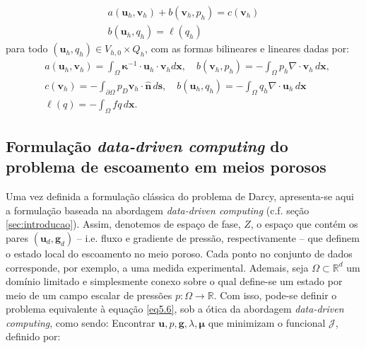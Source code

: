 \begin{equation}
	\begin{aligned}
		a(\mathbf{u}_h , \mathbf{v}_h) + b(\mathbf{v}_h , p_h) = c(\mathbf{v}_h)\\
		b(\mathbf{u}_h , q_h) = \ell(q_h)
	\end{aligned}
\end{equation}
para todo \((\mathbf{u}_h , q_h) \in V_{h,0} \times Q_h\),  com as formas bilineares e lineares dadas por:
\begin{equation}
	\begin{aligned}
		&a(\mathbf{u}_h, \mathbf{v}_{h}) = \int_{\Omega} \boldsymbol{\kappa}^{-1} \cdot \mathbf{u}_{h} \cdot \mathbf{v}_{h} d\mathbf{x}, \quad b(\mathbf{v}_{h},p_{h}) = -\int_{\Omega} p_{h} \nabla \cdot \mathbf{v}_{h} \, d\mathbf{x}, \\
		&c(\mathbf{v}_{h}) = -\int_{\partial \Omega} p_{D} \mathbf{v}_{h} \cdot \mathbf{\hat{n}} \, d\mathbf{s}, \quad b(\mathbf{u}_{h},q_{h}) = -\int_{\Omega} q_{h} \nabla \cdot \mathbf{u}_{h} \, d\mathbf{x}\\
		&\ell(q) = -\int_{\Omega} f q \, d\mathbf{x}.
	\end{aligned}
\end{equation}


\subsection{Formulação \textit{data-driven computing} do problema de escoamento em meios porosos}

Uma vez definida a formulação clássica do problema de Darcy, apresenta-se aqui a formulação baseada na abordagem \textit{data-driven computing} (c.f. seção \ref{sec:introducao}). Assim, denotemos de espaço de fase, $Z$, o espaço que contém os pares $(\mathbf{u}_{d},\mathbf{g}_{d})$ -- i.e. fluxo e gradiente de pressão, respectivamente -- que definem o estado local do escoamento no meio poroso. Cada ponto no conjunto de dados corresponde, por exemplo, a uma medida experimental. Ademais, seja $\Omega \subset \mathbb{R}^{d}$ um domínio limitado e simplesmente conexo sobre o qual define-se um estado por meio de um campo escalar de pressões $p:\Omega \rightarrow \mathbb{R}$. Com isso, pode-se definir o problema equivalente à equação \ref{eq5.6}, sob a ótica da abordagem \textit{data-driven computing}, como sendo: Encontrar $\mathbf{u},p,\mathbf{g}, \lambda, \boldsymbol{\mu}$ que minimizam o funcional $\boldsymbol{\mathcal{J}}$, definido por:

